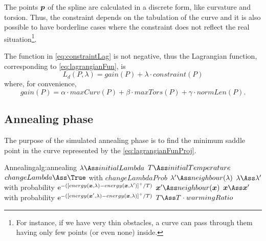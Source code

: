 \documentclass[dissertation.tex]{subfiles}
\begin{document}
The points $\boldsymbol{p}$ of the spline are calculated in a discrete
form, like curvature and torsion. Thus, the constraint depends on the
tabulation of the curve and
it is also possible to have borderline cases where the
constraint does not reflect the real situation\footnote{For instance, if
  we have very thin obstacles, a curve can pass through them having only few
  points (or even none) inside.}.

The
function in \cref{eq:constraintLag} is not negative, thus the
Lagrangian function, corresponding to 
\cref{eq:lagrangianFun}, is
\begin{equation}\label{eq:lagrangianFunProj}
    L_d(P,\lambda)=gain(P)+\lambda\cdot constraint(P)
\end{equation}
where, for convenience,
\begin{equation}\label{eq:gainLag}
  gain(P) = \alpha\cdot maxCurv(P)+\beta\cdot
    maxTors(P)+\gamma\cdot normLen(P).
\end{equation}

\subsection{Annealing phase}
The purpose of the simulated annealing phase is to find the minimum
saddle point in
the curve represented by the
\cref{eq:lagrangianFunProj}.
\begin{algo}{Annealing}{alg:annealing}
  \State $\lambda\Ass initialLambda$\label{alg:annealing:initialize}
  \State $T\Ass initialTemperature$\label{alg:annealing:initialize2}
  \label{alg:annealing:while}
  \label{alg:annealing:for}
  \State $changeLambda\Ass\True$ with $changeLambdaProb$\label{alg:annealing:lambdaProb}
  \State $\lambda'\Ass neighbour(\lambda)$\label{alg:annealing:changeLambda}
  \State $\lambda\Ass \lambda'$ with probability $\mathrm{e}^{-([energy(\boldsymbol{x},\lambda)-energy(\boldsymbol{x},\lambda')]^+/T)}$
  \Else
  \State $\ve{x}'\Ass neighbour(\ve{x})$\label{alg:annealing:changeX}
  \State $\ve{x}\Ass \ve{x}'$ with probability $\mathrm{e}^{-([energy(\boldsymbol{x}',\lambda)-energy(\boldsymbol{x},\lambda)]^+/T)}$
  \EndIf
  \EndFor
  \State $T\Ass T\cdot warmingRatio$\label{alg:annealing:cooling}
  \EndWhile
  \EndProcedure
\end{algo}
\end{document}
